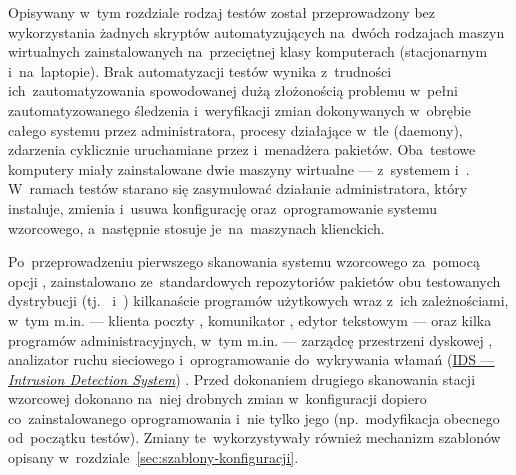 \documentclass[thesis]{subfiles}
\begin{document}
Opisywany w~tym rozdziale rodzaj testów został przeprowadzony bez wykorzystania żadnych skryptów automatyzujących na~dwóch rodzajach maszyn wirtualnych zainstalowanych na~przeciętnej klasy komputerach (stacjonarnym i~na~laptopie). Brak automatyzacji testów wynika z~trudności ich~zautomatyzowania spowodowanej dużą złożonością problemu w~pełni zautomatyzowanego śledzenia i~weryfikacji zmian dokonywanych w~obrębie całego systemu przez administratora, procesy działające w~tle (daemony), zdarzenia cyklicznie uruchamiane przez  i~menadżera pakietów. Oba~testowe komputery miały zainstalowane dwie maszyny wirtualne --- z~systemem \debian{} i~\linuxarch{}. W~ramach testów starano się zasymulować działanie administratora, który instaluje, zmienia i~usuwa konfigurację oraz~oprogramowanie systemu wzorcowego, a~następnie stosuje je~na~maszynach klienckich.

Po~przeprowadzeniu pierwszego skanowania systemu wzorcowego za~pomocą opcji , zainstalowano ze~standardowych repozytoriów pakietów obu testowanych dystrybucji (tj.~\debian{} i~\linuxarch{}) kilkanaście programów użytkowych wraz z~ich zależnościami, w~tym m.in. --- klienta poczty , komunikator , edytor tekstowym  --- oraz kilka programów administracyjnych, w~tym m.in. --- zarządcę przestrzeni dyskowej , analizator ruchu sieciowego  i~oprogramowanie do~wykrywania włamań (\href{https://en.wikipedia.org/wiki/Intrusion_detection_system}{IDS --- \emph{Intrusion Detection System}}) . Przed dokonaniem drugiego skanowania stacji wzorcowej dokonano na~niej drobnych zmian w~konfiguracji dopiero co~zainstalowanego oprogramowania i~nie tylko jego (np.~modyfikacja  obecnego od~początku testów). Zmiany te~wykorzystywały również mechanizm szablonów opisany w~rozdziale~\ref{sec:szablony-konfiguracji}.
\end{document}
